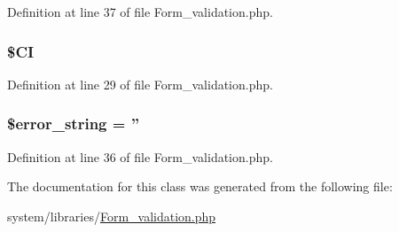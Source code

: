 Definition at line 37 of file Form\-\_\-validation.\-php.

\hypertarget{class_c_i___form__validation_ae0314d046ddf7fcfaec03222977427d3}{
\subsubsection[{\$\-C\-I}]{\setlength{\rightskip}{0pt plus 5cm}\$C\-I\hspace{0.3cm}{\ttfamily [protected]}}}\label{class_c_i___form__validation_ae0314d046ddf7fcfaec03222977427d3}


Definition at line 29 of file Form\-\_\-validation.\-php.

\hypertarget{class_c_i___form__validation_a22323b47b58139586ed855d04138d212}{
\subsubsection[{\$error\-\_\-string}]{\setlength{\rightskip}{0pt plus 5cm}\${\bf error\-\_\-string} = ''\hspace{0.3cm}{\ttfamily [protected]}}}\label{class_c_i___form__validation_a22323b47b58139586ed855d04138d212}


Definition at line 36 of file Form\-\_\-validation.\-php.



The documentation for this class was generated from the following file\-:\begin{DoxyCompactItemize}
\item 
system/libraries/\hyperlink{_form__validation_8php}{Form\-\_\-validation.\-php}\end{DoxyCompactItemize}

